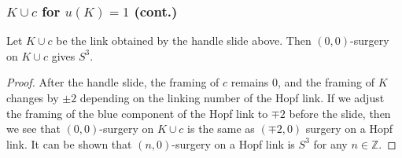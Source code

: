\documentclass{beamer}
\theoremstyle{ex}
\theoremstyle{rem}
\begin{document}
	\begin{frame}
		\frametitle{$K\cup c$ for $u(K)=1$ (cont.)}
		\begin{lemma}
			Let $K\cup c$ be the link obtained by the handle slide above. Then $(0,0)$-surgery on $K\cup c$ gives $S^3$.
		\end{lemma}
		\begin{proof}
		After the handle slide, the framing of $c$ remains 0, and the framing of $K$ changes by $\pm 2$ depending on the linking number of the Hopf link. If we adjust the framing of the blue component of the Hopf link to $\mp 2$ before the slide, then we see that $(0,0)$-surgery on $K\cup c$ is the same as $(\mp 2,0)$ surgery on a Hopf link. It can be shown that $(n,0)$-surgery on a Hopf link is $S^3$ for any $n\in\mathbb{Z}$.
		\end{proof}
	\end{frame}
\end{document}
